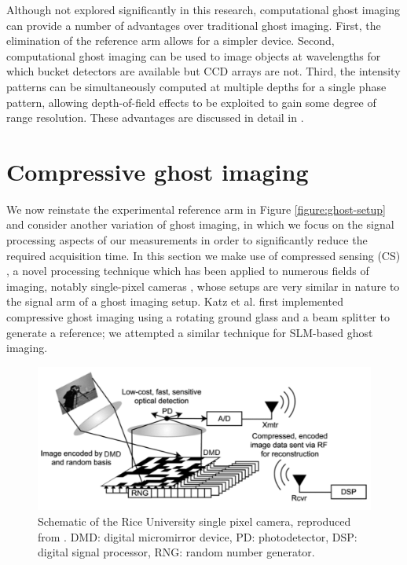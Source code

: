 Although not explored significantly in this research, computational ghost imaging can provide a number of advantages over traditional ghost imaging. First, the elimination of the reference arm allows for a simpler device. Second, computational ghost imaging can be used to image objects at wavelengths for which bucket detectors are available but CCD arrays are not. Third, the intensity patterns can be simultaneously computed at multiple depths for a single phase pattern, allowing depth-of-field effects to be exploited to gain some degree of range resolution. These advantages are discussed in detail in \cite{erkmen-from}.

\section{Compressive ghost imaging}

We now reinstate the experimental reference arm in Figure \ref{figure:ghost-setup} and consider another variation of ghost imaging, in which we focus on the signal processing aspects of our measurements in order to significantly reduce the required acquisition time. In this section we make use of compressed sensing (CS) \cite{candes-stable}, a novel processing technique which has been applied to numerous fields of imaging, notably single-pixel cameras \cite{duarte-single}, whose setups are very similar in nature to the signal arm of a ghost imaging setup. Katz et al. \cite{katz-compressive} first implemented compressive ghost imaging using a rotating ground glass and a beam splitter to generate a reference; we attempted a similar technique for SLM-based ghost imaging.

\begin{figure}[t]
\begin{center}
\includegraphics[width=14cm]{figure-ghost-cscam.pdf}
\caption{Schematic of the Rice University single pixel camera, reproduced from \cite{takhar-new}. DMD: digital micromirror device, PD: photodetector, DSP: digital signal processor, RNG: random number generator.}
\label{figure:ghost-cscam}
\end{center}
\end{figure}

